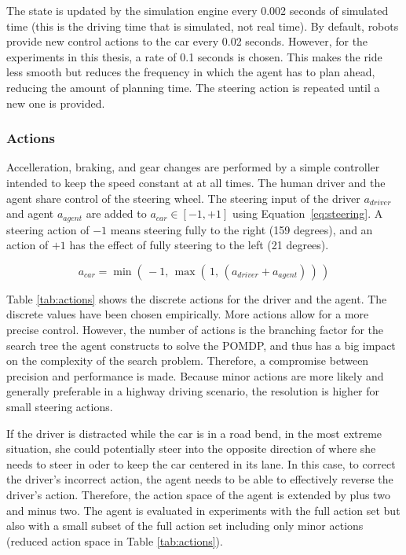 The state is updated by the simulation engine every 0.002 seconds of simulated time (this is the driving time that is simulated, not real time). By default, robots provide new control actions to the car every 0.02 seconds. However, for the experiments in this thesis, a rate of 0.1 seconds is chosen. This makes the ride less smooth but reduces the frequency in which the agent has to plan ahead, reducing the amount of planning time. The steering action is repeated until a new one is provided.

\subsubsection{Actions}
\label{sec:actions}

Accelleration, braking, and gear changes are performed by a simple controller intended to keep the speed constant at at all times. The human driver and the agent share control of the steering wheel. The steering input of the driver $a_{driver}$ and agent $a_{agent}$ are added to $a_{car} \in [-1, +1]$ using Equation~\ref{eq:steering}. A steering action of $-1$ means steering fully to the right (159 degrees), and an action of $+1$ has the effect of fully steering to the left (21 degrees). 

\begin{equation}
    a_{car} = \min(\, -1, \, \max(\, 1, \, (a_{driver} + a_{agent})\,)\,)
    \label{eq:steering}
\end{equation}


Table \ref{tab:actions} shows the discrete actions for the driver and the agent. The discrete values have been chosen empirically. More actions allow for a more precise control. However, the number of actions is the branching factor for the search tree the agent constructs to solve the POMDP, and thus has a big impact on the complexity of the search problem. Therefore, a compromise between precision and performance is made. Because minor actions are more likely and generally preferable in a highway driving scenario, the resolution is higher for small steering actions.



If the driver is distracted while the car is in a road bend, in the most extreme situation, she could potentially steer into the opposite direction of where she needs to steer in oder to keep the car centered in its lane. In this case, to correct the driver's incorrect action, the agent needs to be able to effectively reverse the driver's action. Therefore, the action space of the agent is extended by plus two and minus two. The agent is evaluated in experiments with the full action set but also with a small subset of the full action set including only minor actions (reduced action space in Table \ref{tab:actions}).

